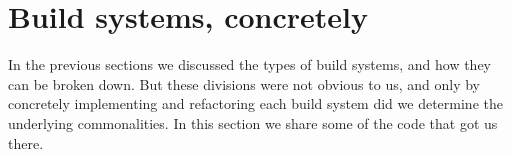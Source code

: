 \section{Build systems, concretely}\label{sec-implementations}

In the previous sections we discussed the types of build systems, and how they
can be broken down. But these divisions were not obvious to us, and only by
concretely implementing and refactoring each build system did we determine the
underlying commonalities. In this section we share some of the code that got us
there.







\subsection{\Make}\label{sec-implementation-make}


